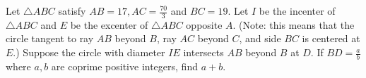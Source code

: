 Let $\triangle ABC$ satisfy $AB = 17, AC = \frac{70}{3}$ and $BC = 19$. Let $I$ be the incenter of $\triangle ABC$ and $E$ be the excenter of $\triangle ABC$ opposite $A$. (Note: this means that the circle tangent to ray $AB$ beyond $B$,  ray $AC$ beyond $C$,  and side $BC$ is centered at $E$.) Suppose the circle with diameter $IE$ intersects $AB$ beyond $B$ at $D$. If $BD = \frac{a}{b}$ where $a, b$ are coprime positive integers, find $a + b$.